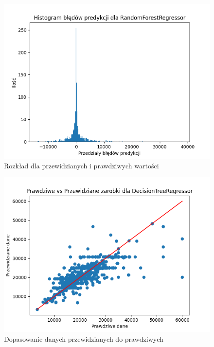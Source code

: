 \documentclass[a4paper]{article}
\begin{document}
\begin{figure}[H]
    \centering
    \includegraphics[width=\textwidth]{../analysis/plots/wyniki/0.8&0.2/RandomForestRegressor/errors.png}
    \caption{Rozkład dla przewidzianych i prawdziwych wartości}
\end{figure}

\begin{figure}[H]
    \centering
    \includegraphics[width=\textwidth]{../analysis/plots/wyniki/0.8&0.2/DecisionTreeRegressor/scatter.png}
    \caption{Dopasowanie danych przewidzianych do prawdziwych}
\end{figure}
\end{document}
